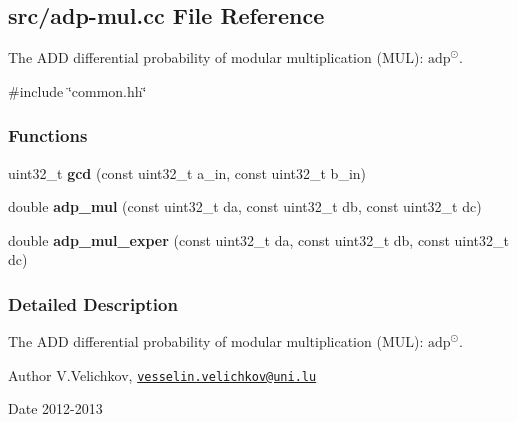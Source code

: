 \hypertarget{adp-mul_8cc}{\subsection{src/adp-\/mul.cc \-File \-Reference}
\label{adp-mul_8cc}
}


\-The \-A\-D\-D differential probability of modular multiplication (\-M\-U\-L)\-: $\mathrm{adp}^{\odot}$.  


{\ttfamily \#include \char`\"{}common.\-hh\char`\"{}}\*
\subsubsection*{\-Functions}
\begin{DoxyCompactItemize}
\item 
\hypertarget{adp-mul_8cc_a9464d8ae9ca8a4435af328b83e4805f8}{uint32\-\_\-t {\bfseries gcd} (const uint32\-\_\-t a\-\_\-in, const uint32\-\_\-t b\-\_\-in)}\label{adp-mul_8cc_a9464d8ae9ca8a4435af328b83e4805f8}

\item 
\hypertarget{adp-mul_8cc_aca5420444a232210f3116127f9bc06e2}{double {\bfseries adp\-\_\-mul} (const uint32\-\_\-t da, const uint32\-\_\-t db, const uint32\-\_\-t dc)}\label{adp-mul_8cc_aca5420444a232210f3116127f9bc06e2}

\item 
\hypertarget{adp-mul_8cc_a1b96a9c60eb19647e8b7a2ef5b109a31}{double {\bfseries adp\-\_\-mul\-\_\-exper} (const uint32\-\_\-t da, const uint32\-\_\-t db, const uint32\-\_\-t dc)}\label{adp-mul_8cc_a1b96a9c60eb19647e8b7a2ef5b109a31}

\end{DoxyCompactItemize}


\subsubsection{\-Detailed \-Description}
\-The \-A\-D\-D differential probability of modular multiplication (\-M\-U\-L)\-: $\mathrm{adp}^{\odot}$. \begin{DoxyAuthor}{\-Author}
\-V.\-Velichkov, \href{mailto:vesselin.velichkov@uni.lu}{\tt vesselin.\-velichkov@uni.\-lu} 
\end{DoxyAuthor}
\begin{DoxyDate}{\-Date}
2012-\/2013 
\end{DoxyDate}
